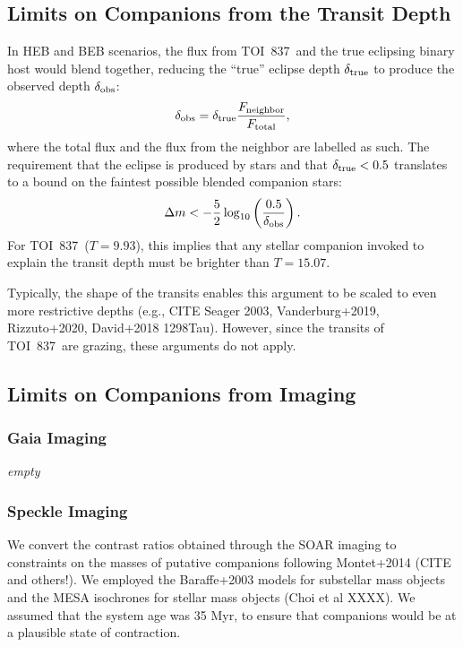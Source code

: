 \documentclass[12pt,twocolumn,tighten]{aastex62}
\newcommand{\tn}{TOI~837} %
\begin{document}
\subsection{Limits on Companions from the Transit Depth}

In HEB and BEB scenarios, the flux from \tn\ and the true eclipsing
binary host would blend together, reducing the ``true'' eclipse depth
$\delta_{\rm true}$ to produce the observed depth
$\delta_{\rm obs}$:
\begin{equation}
  \delta_{\rm obs}
  = 
  \delta_{\rm true} \frac{F_{\rm neighbor}}{F_{\rm total}},
\end{equation}
where the total flux and the flux from the neighbor are labelled as
such.  The requirement that the eclipse is produced by stars and that
$\delta_{\rm true} < 0.5$ translates to a bound on the faintest
possible blended companion stars:
\begin{equation}
    \Delta m < - \frac{5}{2} \log_{10} \left( \frac{0.5}{\delta_{\rm obs}} \right).
\end{equation}
For \tn\ ($T=9.93$), this implies that any stellar companion invoked
to explain the transit depth must be brighter than $T=15.07$.

Typically, the shape of the transits enables this argument to be scaled to even
more restrictive depths (e.g., CITE Seager 2003, Vanderburg+2019,
Rizzuto+2020, David+2018 1298Tau).  However, since the transits of
\tn\ are grazing, these arguments do not apply.

\subsection{Limits on Companions from Imaging}

\subsubsection{Gaia Imaging}
{\it empty}

\subsubsection{Speckle Imaging}

We convert the contrast ratios obtained through the SOAR imaging to
constraints on the masses of putative companions following Montet+2014
(CITE and others!).  We employed the Baraffe+2003 models for
substellar mass objects and the MESA isochrones for stellar mass
objects (Choi et al XXXX).  We assumed that the system age was 35 Myr,
to ensure that companions would be at a plausible state of
contraction.
\end{document}

